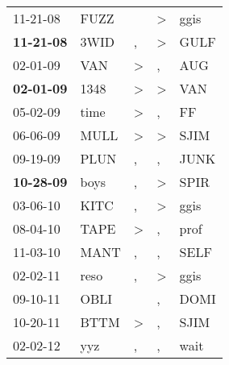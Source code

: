 \begin{supertabular}{p{0.07\textwidth}p{0.06\textwidth}p{0.02\textwidth}p{0.02\textwidth}p{0.06\textwidth}}
          11-21-08\textsuperscript{} &           FUZZ\textsuperscript{} &                  &  \textgreater &           ggis\textsuperscript{} \\
 \textbf{11-21-08\textsuperscript{}} &           3WID\textsuperscript{} &                , &  \textgreater &           GULF\textsuperscript{} \\
          02-01-09\textsuperscript{} &            VAN\textsuperscript{} &     \textgreater &             , &            AUG\textsuperscript{} \\
 \textbf{02-01-09\textsuperscript{}} &           1348\textsuperscript{} &     \textgreater &  \textgreater &            VAN\textsuperscript{} \\
          05-02-09\textsuperscript{} &           time\textsuperscript{} &     \textgreater &             , &             FF\textsuperscript{} \\
          06-06-09\textsuperscript{} &           MULL\textsuperscript{} &     \textgreater &  \textgreater &           SJIM\textsuperscript{} \\
          09-19-09\textsuperscript{} &           PLUN\textsuperscript{} &                , &             , &           JUNK\textsuperscript{} \\
 \textbf{10-28-09\textsuperscript{}} &           boys\textsuperscript{} &                , &  \textgreater &           SPIR\textsuperscript{} \\
          03-06-10\textsuperscript{} &           KITC\textsuperscript{} &                , &  \textgreater &           ggis\textsuperscript{} \\
          08-04-10\textsuperscript{} &           TAPE\textsuperscript{} &     \textgreater &             , &           prof\textsuperscript{} \\
          11-03-10\textsuperscript{} &           MANT\textsuperscript{} &                , &             , &           SELF\textsuperscript{} \\
          02-02-11\textsuperscript{} &           reso\textsuperscript{} &                , &  \textgreater &           ggis\textsuperscript{} \\
          09-10-11\textsuperscript{} &           OBLI\textsuperscript{} &                  &             , &           DOMI\textsuperscript{} \\
          10-20-11\textsuperscript{} &           BTTM\textsuperscript{} &     \textgreater &             , &           SJIM\textsuperscript{} \\
          02-02-12\textsuperscript{} &            yyz\textsuperscript{} &                , &             , &           wait\textsuperscript{} \\

\end{supertabular}
